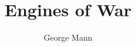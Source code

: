 \documentclass[10pt,twoside,openright,a5paper]{book}
\title{Engines of War}
\author{George Mann}
\date{}
\begin{document}
\pagestyle{plain}

\begin{titlepage}
%
\end{titlepage}

\maketitle

\tableofcontents

\newpage




%

%
%

%

%


%
%
%
%
%
%
%
%
%
%
%
%
%

%
\end{document}
